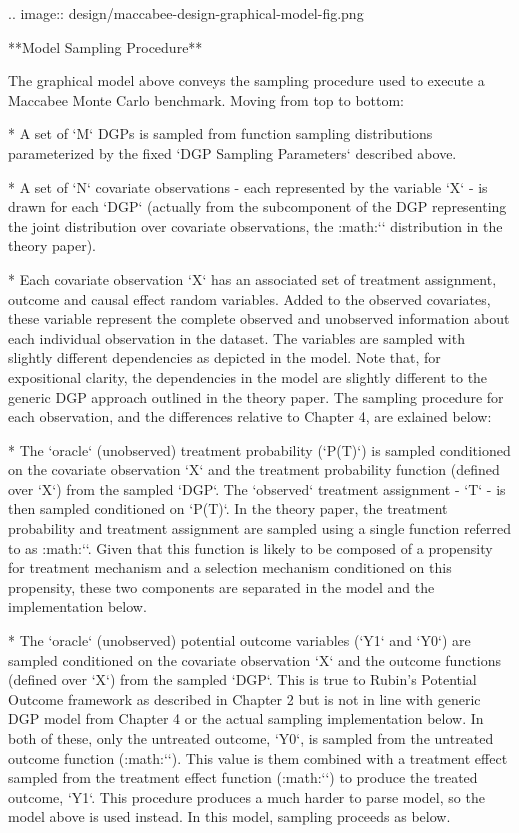 \documentclass[../main.tex]{subfiles}
\begin{document}
.. image:: design/maccabee-design-graphical-model-fig.png

**Model Sampling Procedure**

The graphical model above conveys the sampling procedure used to execute a Maccabee Monte Carlo benchmark. Moving from top to bottom:

* A set of `M` DGPs is sampled from function sampling distributions parameterized by the fixed `DGP Sampling Parameters` described above.

* A set of `N` covariate observations - each represented by the variable `X` - is drawn for each `DGP` (actually from the subcomponent of the DGP representing the joint distribution over covariate observations, the :math:`\rho` distribution in the theory paper).

* Each covariate observation `X` has an associated set of treatment assignment, outcome and causal effect random variables. Added to the observed covariates, these variable represent the complete observed and unobserved information about each individual observation in the dataset. The variables are sampled with slightly different dependencies as depicted in the model. Note that, for expositional clarity, the dependencies in the model are slightly different to the generic DGP approach outlined in the theory paper. The sampling procedure for each observation, and the differences relative to Chapter 4, are exlained below:

  * The `oracle` (unobserved) treatment probability (`P(T)`) is sampled conditioned on the covariate observation `X` and the treatment probability function (defined over `X`) from the sampled `DGP`. The `observed` treatment assignment - `T` - is then sampled conditioned on `P(T)`. In the theory paper, the treatment probability and treatment assignment are sampled using a single function referred to as :math:`\Omega`. Given that this function is likely to be composed of a propensity for treatment mechanism and a selection mechanism conditioned on this propensity, these two components are separated in the model and the implementation below.

  *  The `oracle` (unobserved) potential outcome variables (`Y1` and `Y0`) are sampled conditioned on the covariate observation `X` and the outcome functions (defined over `X`) from the sampled `DGP`. This is true to Rubin's Potential Outcome framework as described in Chapter 2 but is not in line with generic DGP model from Chapter 4 or the actual sampling implementation below. In both of these, only the untreated outcome, `Y0`, is sampled from the untreated outcome function (:math:`\Phi`). This  value is them combined with a treatment effect sampled from the treatment effect function (:math:`\tau`) to produce the treated outcome, `Y1`. This procedure produces a much harder to parse model, so the model above is used instead. In this model, sampling proceeds as below.
\end{document}
